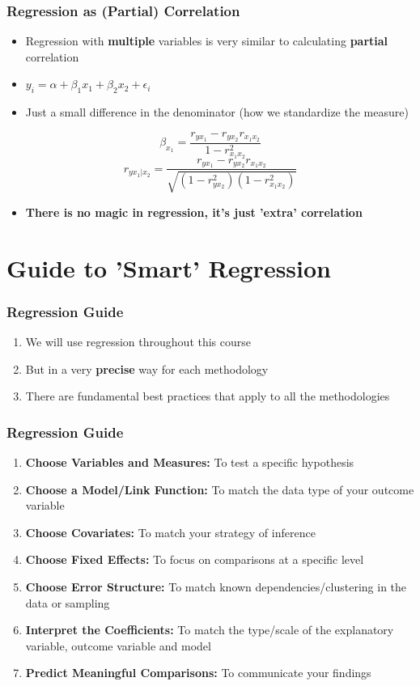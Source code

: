 \documentclass[xcolor=x11names,compress]{beamer}\usepackage[]{graphicx}\usepackage[]{color}
\renewcommand{\(}{\begin{columns}}
\renewcommand{\)}{\end{columns}}
\newcommand{\<}[1]{\begin{column}{#1}}
\renewcommand{\>}{\end{column}}
\begin{document}
\begin{frame}
\frametitle{Regression as (Partial) Correlation}
\begin{itemize}
\item Regression with \textbf{multiple} variables is very similar to calculating \textbf{partial} correlation
\pause
\item $y_i = \alpha + \beta_1 x_1 + \beta_2 x_2 +\epsilon_i$
\pause
\item Just a small difference in the denominator (how we standardize the measure)
\pause
\end{itemize}
$$\beta_{x_1} = \frac{r_{yx_1} - r_{yx_2}r_{x_1x_2}}{1-r^2_{x_1x_2}}$$
$$r_{yx_1|x_2} = \frac{r_{yx_1} - r_{yx_2}r_{x_1x_2}}{\sqrt{(1-r^2_{yx_2})(1-r^2_{x_1x_2})}}$$
\begin{itemize}
\item \textbf{There is no magic in regression, it's just 'extra' correlation}
\end{itemize}
\end{frame}



\section{Guide to 'Smart' Regression}

\begin{frame}
\frametitle{Regression Guide}
\begin{enumerate}
\item We will use regression throughout this course
\pause
\item But in a very \textbf{precise} way for each methodology
\pause
\item There are fundamental best practices that apply to all the methodologies
\end{enumerate}
\end{frame}

\begin{frame}
\frametitle{Regression Guide}
\begin{enumerate}
\item \textbf{Choose Variables and Measures:} To test a specific hypothesis
\pause
\item \textbf{Choose a Model/Link Function:} To match the data type of your outcome variable
\pause
\item \textbf{Choose Covariates:} To match your strategy of inference
\pause
\item \textbf{Choose Fixed Effects:} To focus on comparisons at a specific level
\pause
\item \textbf{Choose Error Structure:} To match known dependencies/clustering in the data or sampling
\pause
\item \textbf{Interpret the Coefficients:} To match the type/scale of the explanatory variable, outcome variable and model
\pause
\item \textbf{Predict Meaningful Comparisons:} To communicate your findings
\end{enumerate}
\end{frame}
\end{document}
